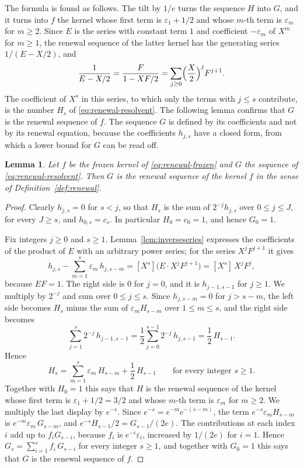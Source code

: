 \documentclass{amsart}
\newtheorem{lemma}[theorem]{Lemma}
\theoremstyle{definition}
\theoremstyle{remark}
\numberwithin{equation}{section}
\begin{document}
The formula is found as follows. The tilt by $1/e$ turns the sequence $H$
into $G$, and it turns into $f$ the kernel whose first term is
$\varepsilon_1+1/2$ and whose $m$-th term is $\varepsilon_m$ for $m\ge2$.
Since $E$ is the series with constant term $1$ and coefficient
$-\varepsilon_m$ of $X^m$ for $m\ge1$, the renewal sequence of the latter
kernel has the generating series $1/(E-X/2)$, and
\[
\frac{1}{E-X/2}=\frac{F}{1-XF/2}=\sum_{j\ge0}\Bigl(\frac X2\Bigr)^{j}F^{j+1}.
\]
The coefficient of $X^s$ in this series, to which only the terms with
$j\le s$ contribute, is the number $H_s$ of \eqref{eq:renewal-resolvent}.
The following lemma confirms that $G$ is the renewal sequence of $f$. The
sequence $G$ is defined by its coefficients and not by its renewal equation,
because the coefficients $h_{j,s}$ have a closed form, from which a lower
bound for $G$ can be read off.

\begin{lemma}\label{lem:frozenrenewal}
Let $f$ be the frozen kernel of \eqref{eq:renewal-frozen} and $G$ the
sequence of \eqref{eq:renewal-resolvent}. Then $G$ is the renewal sequence
of the kernel $f$ in the sense of Definition~\ref{def:renewal}.
\end{lemma}

\begin{proof}
Clearly $h_{j,s}=0$ for $s<j$, so that $H_s$ is the sum of
$2^{-j}h_{j,s}$ over $0\le j\le J$, for every $J\ge s$, and $h_{0,s}=c_s$. In
particular $H_0=c_0=1$, and hence $G_0=1$.

Fix integers $j\ge0$ and $s\ge1$. Lemma~\ref{lem:inverseseries} expresses the
coefficients of the product of $E$ with an arbitrary power series; for the
series $X^jF^{j+1}$ it gives
\[
h_{j,s}-\sum_{m=1}^{s}\varepsilon_m\,h_{j,s-m}
=[X^s]\bigl(E\cdot X^jF^{j+1}\bigr)=[X^s]\,X^jF^{j} ,
\]
because $EF=1$. The right side is $0$ for $j=0$, and it is $h_{j-1,s-1}$ for
$j\ge1$. We multiply by $2^{-j}$ and sum over $0\le j\le s$. Since
$h_{j,s-m}=0$ for $j>s-m$, the left side becomes $H_s$ minus the sum of
$\varepsilon_mH_{s-m}$ over $1\le m\le s$, and the right side becomes
\[
\sum_{j=1}^{s}2^{-j}\,h_{j-1,s-1}
=\frac12\sum_{j=0}^{s-1}2^{-j}\,h_{j,s-1}=\frac12\,H_{s-1} .
\]
Hence
\[
H_s=\sum_{m=1}^{s}\varepsilon_m\,H_{s-m}+\frac12\,H_{s-1}
\qquad\text{for every integer } s\ge1 .
\]
Together with $H_0=1$ this says that
$H$ is the renewal sequence of the kernel whose first term is
$\varepsilon_1+1/2=3/2$ and whose $m$-th term is $\varepsilon_m$ for
$m\ge2$. We multiply the last display by $e^{-s}$. Since
$e^{-s}=e^{-m}e^{-(s-m)}$, the term $e^{-s}\varepsilon_mH_{s-m}$ is
$e^{-m}\varepsilon_m\,G_{s-m}$, and $e^{-s}H_{s-1}/2=G_{s-1}/(2e)$. The
contributions at each index $i$ add up to $f_iG_{s-i}$, because $f_i$ is
$e^{-i}\varepsilon_i$, increased by $1/(2e)$ for $i=1$. Hence
$G_s=\sum_{i=1}^{s}f_i\,G_{s-i}$ for every integer $s\ge1$, and together with
$G_0=1$ this says that $G$ is the renewal sequence of $f$.
\end{proof}
\end{document}
